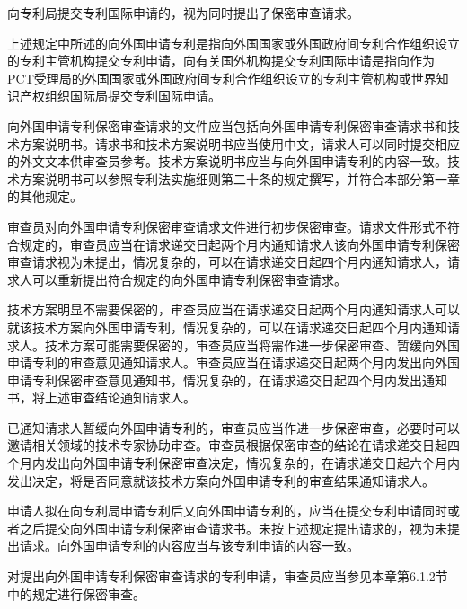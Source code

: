 向专利局提交专利国际申请的，视为同时提出了保密审查请求。

上述规定中所述的向外国申请专利是指向外国国家或外国政府间专利合作组织设立的专利主管机构提交专利申请，向有关国外机构提交专利国际申请是指向作为PCT受理局的外国国家或外国政府间专利合作组织设立的专利主管机构或世界知识产权组织国际局提交专利国际申请。

向外国申请专利保密审查请求的文件应当包括向外国申请专利保密审查请求书和技术方案说明书。请求书和技术方案说明书应当使用中文，请求人可以同时提交相应的外文文本供审查员参考。技术方案说明书应当与向外国申请专利的内容一致。技术方案说明书可以参照专利法实施细则第二十条的规定撰写，并符合本部分第一章的其他规定。

审查员对向外国申请专利保密审查请求文件进行初步保密审查。请求文件形式不符合规定的，审查员应当在请求递交日起两个月内通知请求人该向外国申请专利保密审查请求视为未提出，情况复杂的，可以在请求递交日起四个月内通知请求人，请求人可以重新提出符合规定的向外国申请专利保密审查请求。

技术方案明显不需要保密的，审查员应当在请求递交日起两个月内通知请求人可以就该技术方案向外国申请专利，情况复杂的，可以在请求递交日起四个月内通知请求人。技术方案可能需要保密的，审查员应当将需作进一步保密审查、暂缓向外国申请专利的审查意见通知请求人。审查员应当在请求递交日起两个月内发出向外国申请专利保密审查意见通知书，情况复杂的，在请求递交日起四个月内发出通知书，将上述审查结论通知请求人。

已通知请求人暂缓向外国申请专利的，审查员应当作进一步保密审查，必要时可以邀请相关领域的技术专家协助审查。审查员根据保密审查的结论在请求递交日起四个月内发出向外国申请专利保密审查决定，情况复杂的，在请求递交日起六个月内发出决定，将是否同意就该技术方案向外国申请专利的审查结果通知请求人。

申请人拟在向专利局申请专利后又向外国申请专利的，应当在提交专利申请同时或者之后提交向外国申请专利保密审查请求书。未按上述规定提出请求的，视为未提出请求。向外国申请专利的内容应当与该专利申请的内容一致。

对提出向外国申请专利保密审查请求的专利申请，审查员应当参见本章第6.1.2节中的规定进行保密审查。

